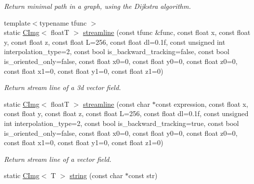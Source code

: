 \begin{DoxyCompactItemize}
\begin{DoxyCompactList}\small\item\em Return minimal path in a graph, using the Dijkstra algorithm. \item\end{DoxyCompactList}\item 
{\footnotesize template$<$typename tfunc $>$ }\\static \hyperlink{structcimg__library_1_1CImg}{CImg}$<$ floatT $>$ \hyperlink{structcimg__library_1_1CImg_af979e5a9602ae9a8007809932adfbd42}{streamline} (const tfunc \&func, const float x, const float y, const float z, const float L=256, const float dl=0.1f, const unsigned int interpolation\_\-type=2, const bool is\_\-backward\_\-tracking=false, const bool is\_\-oriented\_\-only=false, const float x0=0, const float y0=0, const float z0=0, const float x1=0, const float y1=0, const float z1=0)
\begin{DoxyCompactList}\small\item\em Return stream line of a 3d vector field. \item\end{DoxyCompactList}\item 
\hypertarget{structcimg__library_1_1CImg_a5f9d01bb2a106a060166e6493c6ee3ce}{
static \hyperlink{structcimg__library_1_1CImg}{CImg}$<$ floatT $>$ \hyperlink{structcimg__library_1_1CImg_a5f9d01bb2a106a060166e6493c6ee3ce}{streamline} (const char $\ast$const expression, const float x, const float y, const float z, const float L=256, const float dl=0.1f, const unsigned int interpolation\_\-type=2, const bool is\_\-backward\_\-tracking=true, const bool is\_\-oriented\_\-only=false, const float x0=0, const float y0=0, const float z0=0, const float x1=0, const float y1=0, const float z1=0)}
\label{structcimg__library_1_1CImg_a5f9d01bb2a106a060166e6493c6ee3ce}

\begin{DoxyCompactList}\small\item\em Return stream line of a vector field. \item\end{DoxyCompactList}\item 
\hypertarget{structcimg__library_1_1CImg_a6f970324648c6b06d4b289ba7f3b82bc}{
static \hyperlink{structcimg__library_1_1CImg}{CImg}$<$ T $>$ \hyperlink{structcimg__library_1_1CImg_a6f970324648c6b06d4b289ba7f3b82bc}{string} (const char $\ast$const str)}
\label{structcimg__library_1_1CImg_a6f970324648c6b06d4b289ba7f3b82bc}


\end{DoxyCompactItemize}
